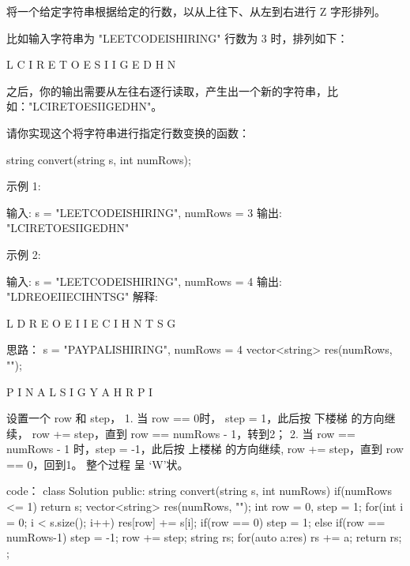 将一个给定字符串根据给定的行数，以从上往下、从左到右进行 Z 字形排列。

比如输入字符串为 "LEETCODEISHIRING" 行数为 3 时，排列如下：

L   C   I   R
E T O E S I I G
E   D   H   N

之后，你的输出需要从左往右逐行读取，产生出一个新的字符串，比如："LCIRETOESIIGEDHN"。

请你实现这个将字符串进行指定行数变换的函数：

string convert(string s, int numRows);

示例 1:

输入: s = "LEETCODEISHIRING", numRows = 3
输出: "LCIRETOESIIGEDHN"

示例 2:

输入: s = "LEETCODEISHIRING", numRows = 4
输出: "LDREOEIIECIHNTSG"
解释:

L     D     R
E   O E   I I
E C   I H   N
T     S     G































思路：
s = "PAYPALISHIRING", numRows = 4
vector<string> res(numRows, "");

P             I           N
  A         L   S       I   G
    Y     A       H   R
       P            I

设置一个 row 和 step，
1. 当 row == 0时， step = 1，此后按 下楼梯 的方向继续， row += step，直到 row == numRows - 1，转到2；
2. 当 row == numRows - 1 时，step = -1，此后按 上楼梯 的方向继续, row += step，直到 row == 0，回到1。
整个过程 呈 ‘W’状。





























code：
class Solution {
public:
    string convert(string s, int numRows) {
        if(numRows <= 1) return s;
        vector<string> res(numRows, "");
        int row = 0, step = 1;
        for(int i = 0; i < s.size(); i++)
        {
            res[row] += s[i];
            if(row == 0) step = 1;
            else if(row == numRows-1) step = -1;
            row += step;
        }
        string rs;
        for(auto a:res)
            rs += a;
        return rs;
    }
};